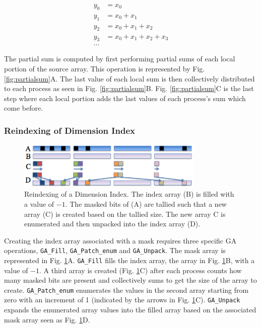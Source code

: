 \begin{equation}
\begin{split}
y_0 &= x_0\\
y_1 &= x_0 + x_1\\
y_2 &= x_0 + x_1 + x_2\\
y_3 &= x_0 + x_1 + x_2 + x_3\\
\ldots
\end{split}
\end{equation}

The partial sum is computed by first performing partial sums of each local
portion of the source array.  This operation is represented by Fig.
\ref{fig:partialsum}A.  The last value of each local sum is then collectively
distributed to each process as seen in Fig. \ref{fig:partialsum}B.  Fig.
\ref{fig:partialsum}C is the last step where each local portion adds the last
values of each process's sum which come before.

\subsubsection{Reindexing of Dimension Index}

\begin{figure}[!t]
\center
\includegraphics[width=3.5in]{images/unpack}
\caption{Reindexing of a Dimension Index.  The index array (B) is filled with
a value of $-1$.  The masked bits of (A) are tallied such that a new array (C)
is created based on the tallied size.  The new array C is enumerated and then
unpacked into the index array (D).}
\label{fig:unpack}
\end{figure}

Creating the index array associated with a mask requires three specific GA
operations, \verb=GA_Fill=, \verb=GA_Patch_enum= and \verb=GA_Unpack=.  The
mask array is represented in Fig. \ref{fig:unpack}A.  \verb=GA_Fill= fills the
index array, the array in Fig. \ref{fig:unpack}B, with a value of $-1$.  A
third array is created (Fig. \ref{fig:unpack}C) after each process counts how
many masked bits are present and collectively sums to get the size of the
array to create.  \verb=GA_Patch_enum= enumerates the values in the second
array starting from zero with an increment of 1 (indicated by the arrows in
Fig. \ref{fig:unpack}C).  \verb=GA_Unpack= expands the enumerated array values
into the filled array based on the associated mask array seen as Fig.
\ref{fig:unpack}D.

